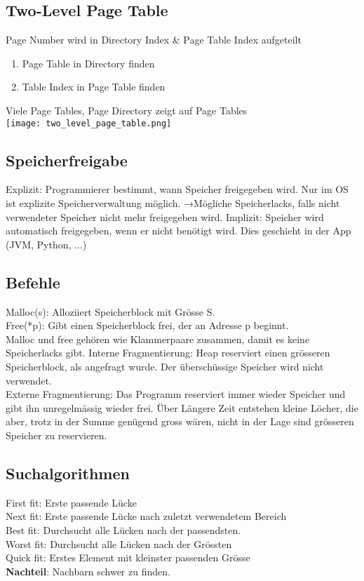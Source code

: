 \subsection{Two-Level Page Table}
Page Number wird in Directory Index \& Page Table Index aufgeteilt\\
\vspace{-0.2cm}
\begin{enumerate}
	\item Page Table in Directory finden
	\vspace{-0.2cm}
	\item Table Index in Page Table finden
\end{enumerate}
\vspace{-0.2cm}
Viele Page Tables, Page Directory zeigt auf Page Tables\\
\texttt{[image: two\_level\_page\_table.png]}
\subsection{Speicherfreigabe}
\textcolor{myblue}{Explizit}: Programmierer bestimmt, wann Speicher freigegeben wird.
Nur im OS ist explizite Speicherverwaltung möglich. →Mögliche Speicherlacks,
falls nicht verwendeter Speicher nicht mehr freigegeben wird.
\textcolor{myblue}{Implizit}: Speicher wird automatisch freigegeben, wenn er nicht benötigt wird.
Dies geschieht in der App (JVM, Python, ...)
\subsection{Befehle}
\textcolor{myblue}{Malloc(s)}: Alloziiert Speicherblock mit Grösse S.\\
\textcolor{myblue}{Free(*p)}: Gibt einen Speicherblock frei, der an Adresse p beginnt.\\
Malloc und free gehören wie Klammerpaare zusammen, damit es keine Speicherlacks gibt.
\textcolor{myblue}{Interne Fragmentierung}: Heap reserviert einen grösseren Speicherblock, als
angefragt wurde. Der überschüssige Speicher wird nicht verwendet.\\
\textcolor{myblue}{Externe Fragmentierung}: Das Programm reserviert immer wieder Speicher und
gibt ihn unregelmässig wieder frei. Über Längere Zeit entstehen kleine Löcher,
die aber, trotz in der Summe genügend gross wären, nicht in der Lage sind
grösseren Speicher zu reservieren.\\
\subsection{Suchalgorithmen}
\textcolor{myblue}{First fit}: Erste passende Lücke\\
\textcolor{myblue}{Next fit}: Erste passende Lücke nach zuletzt verwendetem Bereich\\
\textcolor{myblue}{Best fit}: Durchsucht alle Lücken nach der passendsten.\\
\textcolor{myblue}{Worst fit}: Durchsucht alle Lücken nach der Grössten\\
\textcolor{myblue}{Quick fit}: Erstes Element mit kleinster passenden Grösse\\
\textbf{Nachteil}: Nachbarn schwer zu finden.\\
